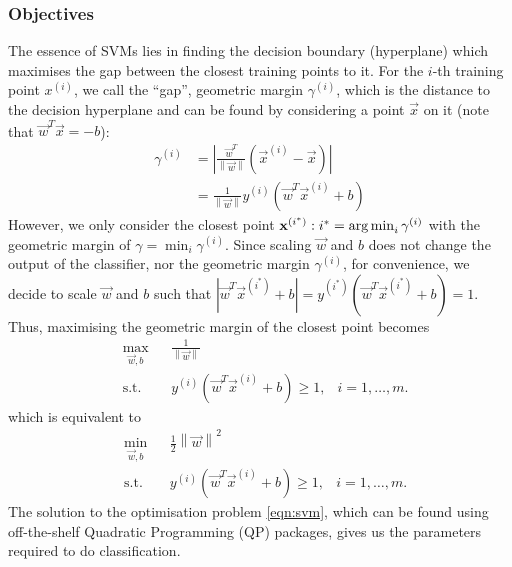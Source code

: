 \subsubsection{Objectives}
	The essence of SVMs lies in finding the decision boundary (hyperplane) which maximises the gap between the closest training points to it. For the $i$-th training point $x^{(i)}$, we call the ``gap'', geometric margin $\gamma^{(i)}$, which is the distance to the decision hyperplane and can be found by considering a point $\vec{x}$ on it (note that $\vec{w}^T\vec{x} = -b$):
	\begin{align*}
		\gamma^{(i)} 	&= \left| \frac{\vec{w}^T}{\left\| \vec{w} \right\|} \left( \vec{x}^{(i)} - \vec{x} \right) \right| \\
					&= \frac{1}{\left\| \vec{w} \right\|} y^{(i)} \left( \vec{w}^T \vec{x}^{(i)} + b \right)
	\end{align*}
However, we only consider the closest point $\boldsymbol{\mathbf{x}}^{\left( i^\ast \right)} : i^\ast = \operatorname*{arg\,min}_i{\gamma^{(i)}}$ with the geometric margin of $\gamma = \min_{i}{\gamma^{(i)}}$. Since scaling $\vec{w}$ and $b$ does not change the output of the classifier, nor the geometric margin $\gamma^{(i)}$, for convenience, we decide to scale $\vec{w}$ and $b$ such that $\left| \vec{w}^T \vec{x}^{(i^\ast)} + b \right| = y^{(i^\ast)} \left( \vec{w}^T \vec{x}^{(i^\ast)} + b \right) = 1$. Thus, maximising the geometric margin of the closest point becomes
	\begin{equation*}
	\begin{aligned}
		&\max_{\vec{w}, b} 		& & \frac{1}{\left\| \vec{w} \right\|} \\
		&\text{s.t.}				& & y^{(i)}(\vec{w}^T\vec{x}^{(i)} + b) \geq 1, &i=1,\dotsc,m.
	\end{aligned}
	\end{equation*}
which is equivalent to
	\begin{equation}
	\begin{aligned}
		&\min_{\vec{w}, b} 	& & \frac{1}{2} \left\| \vec{w} \right\|^2 \\
		&\text{s.t.}				& & y^{(i)}(\vec{w}^T\vec{x}^{(i)} + b) \geq 1, &i=1,\dotsc,m.
	\end{aligned}
	\label{eqn:svm}
	\end{equation}
The solution to the optimisation problem \eqref{eqn:svm}, which can be found using off-the-shelf Quadratic Programming (QP) packages, gives us the parameters required to do classification.

